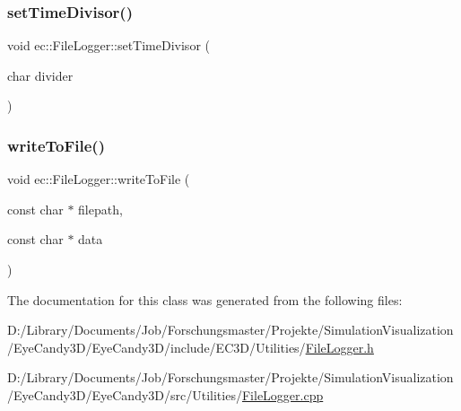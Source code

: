 \mbox{\label{classec_1_1_file_logger_a4ea3c43bdea87979d69f8f3ff1496259}} 
\subsubsection{\texorpdfstring{set\+Time\+Divisor()}{setTimeDivisor()}}
{\footnotesize\ttfamily void ec\+::\+File\+Logger\+::set\+Time\+Divisor (\begin{DoxyParamCaption}\item[{char}]{divider }\end{DoxyParamCaption})\hspace{0.3cm}{\ttfamily [static]}}

\mbox{\label{classec_1_1_file_logger_a834c7fef56181f49afd88657fe2162fe}} 
\subsubsection{\texorpdfstring{write\+To\+File()}{writeToFile()}}
{\footnotesize\ttfamily void ec\+::\+File\+Logger\+::write\+To\+File (\begin{DoxyParamCaption}\item[{const char $\ast$}]{filepath,  }\item[{const char $\ast$}]{data }\end{DoxyParamCaption})\hspace{0.3cm}{\ttfamily [static]}}



The documentation for this class was generated from the following files\+:\begin{DoxyCompactItemize}
\item 
D\+:/\+Library/\+Documents/\+Job/\+Forschungsmaster/\+Projekte/\+Simulation\+Visualization/\+Eye\+Candy3\+D/\+Eye\+Candy3\+D/include/\+E\+C3\+D/\+Utilities/\mbox{\hyperlink{_file_logger_8h}{File\+Logger.\+h}}\item 
D\+:/\+Library/\+Documents/\+Job/\+Forschungsmaster/\+Projekte/\+Simulation\+Visualization/\+Eye\+Candy3\+D/\+Eye\+Candy3\+D/src/\+Utilities/\mbox{\hyperlink{_file_logger_8cpp}{File\+Logger.\+cpp}}\end{DoxyCompactItemize}
